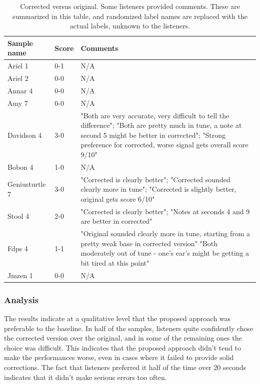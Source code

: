 \begin{table}
  \begin{center}
    
    \label{tab:original-scores}
    \begin{tabularx}{\columnwidth}{|l|l|X|}
    \hline
\textbf{Sample name} & \textbf{Score} & \textbf{Comments} \\
\hline\hline
Ariel 1 & 0-1 & N/A \\
\hline
Ariel 2 & 0-0 & N/A \\ 
\hline
Annar 4 & 0-0 & N/A \\ 
\hline
Amy 7 & 0-0 & N/A \\
\hline
Davidson 4 & 3-0 & "Both are very accurate, very difficult to tell the difference"; "Both are pretty much in tune, a note at second 5 might be better in corrected"; "Strong preference for corrected, worse signal gets overall score 9/10"\\ 
\hline
Bobon 4 & 1-0 & N/A \\ 
\hline
Geniusturtle 7 & 3-0 & "Corrected is clearly better"; "Corrected sounded clearly more in tune"; "Corrected is slightly better, original gets score 6/10"\\ 
\hline
Stool 4 & 2-0 & "Corrected is clearly better"; "Notes at seconds 4 and 9 are better in corrected" \\ 
\hline
Fdps 4 & 1-1 & "Original sounded clearly more in tune, starting from a pretty weak base in corrected version" "Both moderately out of tune - one's ear's might be getting a bit tired at this point" \\ 
\hline
Jmzen 1 & 0-0 & N/A \\ 
\hline
    \end{tabularx}
    \caption{Corrected versus original. Some listeners provided comments. These are summarized in this table, and randomized label names are replaced with the actual labels, unknown to the listeners.}
  \end{center}
\end{table}

\subsubsection{Analysis}
The results indicate at a qualitative level that the proposed approach was preferable to the baseline. In half of the samples, listeners quite confidently chose the corrected version over the original, and in some of the remaining ones the choice was difficult. This indicates that the proposed approach didn't tend to make the performances worse, even in cases where it failed to provide solid corrections. The fact that listeners preferred it half of the time over 20 seconds indicates that it didn't make serious errors too often.


